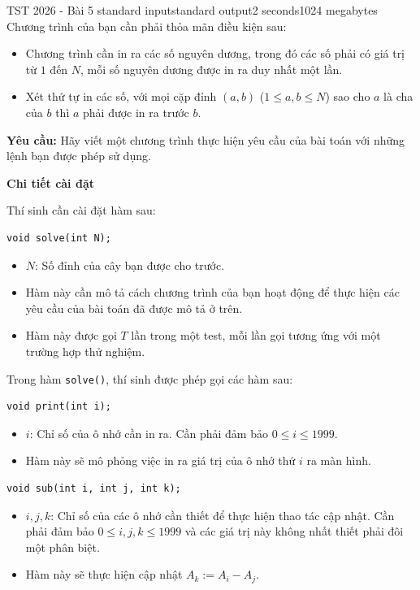 \begin{problem}{TST 2026 - Bài 5 }{standard input}{standard output}{2 seconds}{1024 megabytes}
Chương trình của bạn cần phải thỏa mãn điều kiện sau:
\begin{itemize}
    \item Chương trình cần in ra các số nguyên dương, trong đó các số phải có giá trị từ $1$ đến $N$, mỗi số nguyên dương được in ra duy nhất một lần.
    \item Xét thứ tự in các số, với mọi cặp đỉnh $(a,b)$ ($1\le a,b\le N$) sao cho $a$ là cha của $b$ thì $a$ phải được in ra trước $b$.
\end{itemize}

\textbf{Yêu cầu:} Hãy viết một chương trình thực hiện yêu cầu của bài toán với những lệnh bạn được phép sử dụng.


\InputFile
\textbf{Chi tiết cài đặt}

Thí sinh cần cài đặt hàm sau:

\begin{lstlisting}
void solve(int N);
\end{lstlisting}

\begin{itemize}
   \item $N$: Số đỉnh của cây bạn được cho trước.
   \item Hàm này cần mô tả cách chương trình của bạn hoạt động để thực hiện các yêu cầu của bài toán đã được mô tả ở trên.
   \item Hàm này được gọi $T$ lần trong một test, mỗi lần gọi tương ứng với một trường hợp thử nghiệm.
\end{itemize}

Trong hàm \texttt{solve()}, thí sinh được phép gọi các hàm sau:

\begin{lstlisting}
void print(int i);
\end{lstlisting}

\begin{itemize}
   \item $i$: Chỉ số của ô nhớ cần in ra. Cần phải đảm bảo $0\le i\le 1999$.
   \item Hàm này sẽ mô phỏng việc in ra giá trị của ô nhớ thứ $i$ ra màn hình.
\end{itemize}

\begin{lstlisting}
void sub(int i, int j, int k);
\end{lstlisting}

\begin{itemize}
   \item $i,j,k$: Chỉ số của các ô nhớ cần thiết để thực hiện thao tác cập nhật. Cần phải đảm bảo $0\le i,j,k\le 1999$ và các giá trị này không nhất thiết phải đôi một phân biệt.
   \item Hàm này sẽ thực hiện cập nhật $A_k:=A_i-A_j$.
\end{itemize}


\end{problem}

